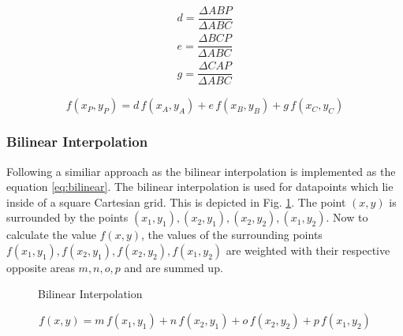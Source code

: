 \documentclass[11pt,twoside,a4paper,fleqn]{report}
\numberwithin{equation}{chapter}
\numberwithin{figure}{chapter}
\numberwithin{table}{chapter}
\begin{document}
\begin{equation}
	\begin{aligned}
		d = \dfrac{\Delta ABP}{\Delta ABC}\\
		e = \dfrac{\Delta BCP}{\Delta ABC}\\
		g = \dfrac{\Delta CAP}{\Delta ABC}
	\end{aligned}
	\label{eq:barycor}
\end{equation}

\begin{equation}
f(x_P,y_P) = d\,f(x_A,y_A)+e\,f(x_B,y_B)+g\,f(x_C,y_C)
\label{eq:baryeq}
\end{equation}

\subsubsection{Bilinear Interpolation}
Following a similiar approach as \cite{bilinear} the bilinear interpolation is implemented as the equation \ref{eq:bilinear}. The bilinear interpolation is used for datapoints which lie inside of a square Cartesian grid. This is depicted in Fig. \ref{fig:bilinear}. The point $(x,y)$ is surrounded by the points $(x_1,y_1),(x_2,y_1),(x_2,y_2),(x_1,y_2)$. Now to calculate the value $f(x,y)$, the values of the surrounding points $f(x_1,y_1),f(x_2,y_1),f(x_2,y_2),f(x_1,y_2)$ are weighted with their respective opposite areas $m,n,o,p $ and are summed up. 


\begin{figure}[H]
	\centering
	\caption{Bilinear Interpolation}
	\label{fig:bilinear}	
\end{figure}

\begin{equation}
	f(x,y) = m\,f(x_1,y_1)+n\,f(x_2,y_1)+o\,f(x_2,y_2)+p\,f(x_1,y_2)
	\label{eq:bilinear}
\end{equation}
\end{document}
